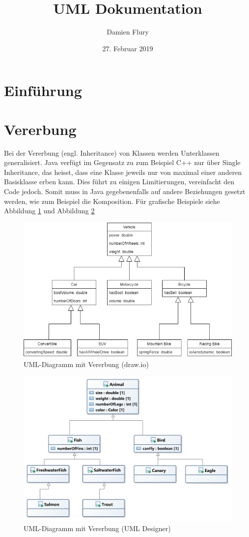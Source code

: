 \documentclass[a4paper, titlepage]{scrartcl}
\title{UML Dokumentation}
\author{Damien Flury}
\date{27. Februar 2019}
\begin{document}
    \maketitle
    \tableofcontents
    \newpage
    \section{Einführung}
    \section{Vererbung}
    Bei der Vererbung (engl. Inheritance) von Klassen werden Unterklassen generalisiert. Java
    verfügt im Gegensatz zu zum Beispiel C++ nur über Single Inheritance, das heisst, dass eine Klasse
    jeweils nur von maximal einer anderen Basisklasse erben kann. Dies führt zu einigen Limitierungen,
    vereinfacht den Code jedoch. Somit muss in Java gegebenenfalls auf andere Beziehungen gesetzt werden,
    wie zum Beispiel die Komposition. Für grafische Beispiele siehe Abbildung \ref{VererbungDrawIO}
    und Abbildung \ref{VererbungUmlDesigner}
    \begin{figure}
        \includegraphics[width=\textwidth]{Klassendiagramm1a}
        \caption{UML-Diagramm mit Vererbung (draw.io)}
        \label{VererbungDrawIO}
    \end{figure}
    \begin{figure}
        \includegraphics[width=\textwidth]{Klassendiagramm1b}
        \caption{UML-Diagramm mit Vererbung (UML Designer)}
        \label{VererbungUmlDesigner}
    \end{figure}
    
\end{document}
